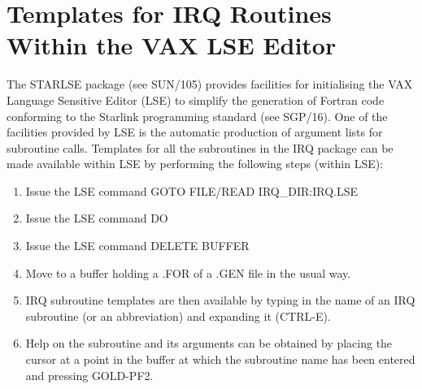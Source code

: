 \newpage
{}
\newpage

\section{Templates for IRQ Routines Within the VAX LSE Editor}
The STARLSE package (see SUN/105) provides facilities for initialising the VAX
Language Sensitive Editor (LSE) to simplify the generation of Fortran
code conforming to the Starlink programming standard (see SGP/16). One of the
facilities provided by LSE is the automatic production of argument lists for
subroutine calls. Templates for all the subroutines in the IRQ package can be 
made available within LSE by performing the following steps (within LSE):
\begin{enumerate}
\item Issue the LSE command GOTO FILE/READ IRQ\_DIR:IRQ.LSE
\item Issue the LSE command DO
\item Issue the LSE command DELETE BUFFER
\item Move to a buffer holding a .FOR of a .GEN file in the usual way.
\item IRQ subroutine templates are then available by typing in the name of an 
IRQ subroutine (or an abbreviation) and expanding it (CTRL-E).
\item Help on the subroutine and its arguments can be obtained by placing the
cursor at a point in the buffer at which the subroutine name has been entered 
and pressing GOLD-PF2.
\end{enumerate}

